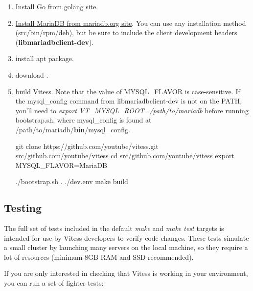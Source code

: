 \begin{enumerate}
\item \href{http://golang.org/doc/install}{Install Go from golang site}.
\item \href{https://downloads.mariadb.org/}{Install MariaDB from mariadb.org site}.
You can use any installation method (src/bin/rpm/deb),
but be sure to include the client development headers (\textbf{libmariadbclient-dev}).

\item install apt package.
% 

\item download .

\item build Vitess.
Note that the value of MYSQL\_FLAVOR is case-sensitive.
If the mysql\_config command from libmariadbclient-dev is not on the PATH,
you'll need to \emph{export VT\_MYSQL\_ROOT=/path/to/mariadb} before running bootstrap.sh,
where mysql\_config is found at /path/to/mariadb/\textbf{bin}/mysql\_config.



\begin{codesample4}
    git clone https://github.com/youtube/vitess.git src/github.com/youtube/vitess
    cd src/github.com/youtube/vitess
    export MYSQL_FLAVOR=MariaDB
    
    ./bootstrap.sh
    . ./dev.env
    make build
\end{codesample4}
\end{enumerate}
\subsection{Testing}\hypertarget{testing}{}\label{testing}

The full set of tests included in the default \emph{make} and \emph{make test} targets
is intended for use by Vitess developers to verify code changes.
These tests simulate a small cluster by launching many servers on the local
machine, so they require a lot of resources (minimum 8GB RAM and SSD recommended).

If you are only interested in checking that Vitess is working in your
environment, you can run a set of lighter tests:

